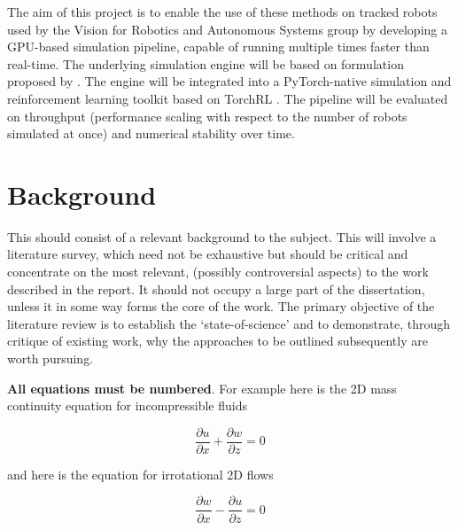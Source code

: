 \documentclass[a4paper,12pt]{article}
\begin{document}
The aim of this project is to enable the use of these methods on tracked robots used by the Vision for Robotics and Autonomous Systems group by developing a GPU-based simulation pipeline, capable of running multiple times faster than real-time. The underlying simulation engine will be based on formulation proposed by \citet{Agishev_2024}. The engine will be integrated into a PyTorch-native \citep{paszke2019pytorchimperativestylehighperformance} simulation and reinforcement learning toolkit based on TorchRL \citep{bou2023torchrldatadrivendecisionmakinglibrary}. The pipeline will be evaluated on throughput (performance scaling with respect to the number of robots simulated at once) and numerical stability over time.





\clearpage


\section{Background}
\label{sec:background}

This should consist of a relevant background to the subject. This will involve a literature survey, which need not be exhaustive but should be critical and concentrate on the most relevant, (possibly controversial aspects) to the work described in the report. It should not occupy a large part of the dissertation, unless it in some way forms the core of the work. The primary objective of the literature review is to establish the ‘state-of-science’ and to demonstrate, through critique of existing work, why the approaches to be outlined subsequently are worth pursuing.

\textbf{All equations must be numbered}. For example here is the 2D mass continuity equation for incompressible fluids


\begin{equation}
  \label{eq:mass-continuity}
  \frac{\partial u}{\partial x} + \frac{\partial w}{\partial z} = 0
\end{equation}

and here is the equation for irrotational 2D flows

\begin{equation}
  \label{eq:irrotationality}
  \frac{\partial w}{\partial x} - \frac{\partial u}{\partial z} = 0
\end{equation}
\end{document}
